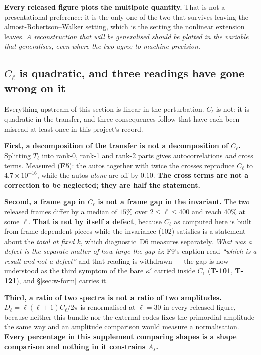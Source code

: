 \textbf{Every released figure plots the multipole quantity.} That is not a
presentational preference: it is the only one of the two that survives leaving
the almost-Robertson--Walker setting, which is the setting the nonlinear
extension leaves. \emph{A reconstruction that will be generalised should be
plotted in the variable that generalises, even where the two agree to machine
precision.}

\subsection{$C_\ell$ is quadratic, and three readings have gone wrong on it}

Everything upstream of this section is linear in the perturbation.
$C_\ell$ is not: it is quadratic in the transfer, and three consequences follow
that have each been misread at least once in this project's record.

\textbf{First, a decomposition of the transfer is not a decomposition of
$C_\ell$.} Splitting $T_\ell$ into rank-0, rank-1 and rank-2 parts gives
autocorrelations \emph{and} cross terms. Measured (\textbf{F5}): the autos
together with twice the crosses reproduce $C_\ell$ to $4.7\times10^{-16}$,
while the autos \emph{alone} are off by $0.10$. \textbf{The cross terms are not
a correction to be neglected; they are half the statement.}

\textbf{Second, a frame gap in $C_\ell$ is not a frame gap in the invariant.}
The two released frames differ by a median of $15\%$ over $2\le\ell\le400$ and
reach $40\%$ at some $\ell$. \textbf{That is not by itself a defect}, because
$C_\ell$ as computed here is built from frame-dependent pieces while the
invariance (102) satisfies is a statement about the \emph{total at fixed $k$},
which diagnostic~D6 measures separately. \emph{What was a defect is the
separate matter of how large the gap is}: F9's caption read \emph{``which is a
result and not a defect''} and that reading is withdrawn --- the gap is now
understood as the third symptom of the bare $\kappa'$ carried inside $C_1$
(\textbf{T-101}, \textbf{T-121}), and \S\ref{sec:w-form} carries it.

\textbf{Third, a ratio of two spectra is not a ratio of two amplitudes.}
$D_\ell=\ell(\ell+1)C_\ell/2\pi$ is renormalised at $\ell=30$ in every released
figure, because neither this bundle nor the external codes fixes the primordial
amplitude the same way and an amplitude comparison would measure a
normalisation. \textbf{Every percentage in this supplement comparing shapes is
a shape comparison and nothing in it constrains $A_s$.}


